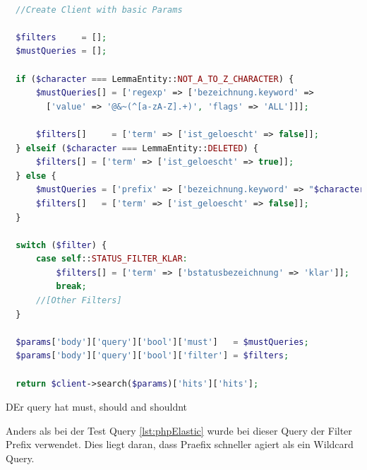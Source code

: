 \begin{lstlisting}[language=PHP, frame=single, label={lst:queryEla}] 

  //Create Client with basic Params

  $filters     = [];
  $mustQueries = [];

  if ($character === LemmaEntity::NOT_A_TO_Z_CHARACTER) {
      $mustQueries[] = ['regexp' => ['bezeichnung.keyword' => 
        ['value' => '@&~(^[a-zA-Z].+)', 'flags' => 'ALL']]];

      $filters[]     = ['term' => ['ist_geloescht' => false]];
  } elseif ($character === LemmaEntity::DELETED) {
      $filters[] = ['term' => ['ist_geloescht' => true]];
  } else {
      $mustQueries = ['prefix' => ['bezeichnung.keyword' => "$character"]];
      $filters[]   = ['term' => ['ist_geloescht' => false]];
  }

  switch ($filter) {
      case self::STATUS_FILTER_KLAR:
          $filters[] = ['term' => ['bstatusbezeichnung' => 'klar']];
          break;
      //[Other Filters]
  }

  $params['body']['query']['bool']['must']   = $mustQueries;
  $params['body']['query']['bool']['filter'] = $filters;

  return $client->search($params)['hits']['hits'];

\end{lstlisting}

DEr query hat must, should and shouldnt

Anders als bei der Test Query \ref{lst:phpElastic} wurde bei dieser Query der Filter Prefix verwendet. Dies liegt daran, dass Praefix schneller agiert als ein Wildcard Query.